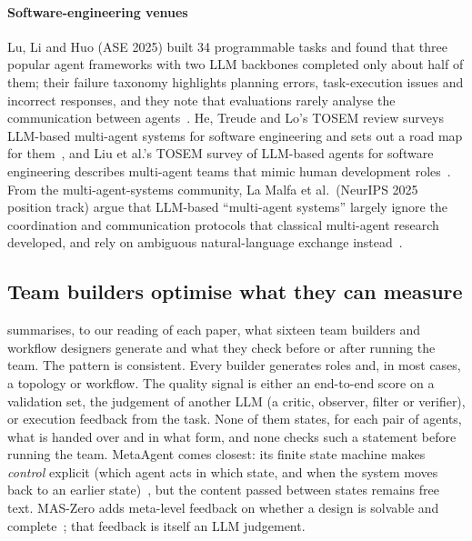 \documentclass[10pt,a4paper]{article}
\begin{document}
\paragraph{Software-engineering venues} Lu, Li and Huo (ASE 2025) built 34
programmable tasks and found that three popular agent frameworks with two
LLM backbones completed only about half of them; their failure taxonomy
highlights planning errors, task-execution issues and incorrect responses,
and they note that evaluations rarely analyse the communication between
agents~\cite{lu2025exploring}. He, Treude and Lo's TOSEM review surveys
LLM-based multi-agent systems for software engineering and sets out a road
map for them~\cite{he2025lma}, and Liu et al.'s TOSEM survey of LLM-based
agents for software engineering describes multi-agent teams that mimic
human development roles~\cite{liu2024agents4se}.
From the multi-agent-systems community, La Malfa et al.\ (NeurIPS 2025
position track) argue that LLM-based ``multi-agent systems'' largely
ignore the coordination and communication protocols that classical
multi-agent research developed, and rely on ambiguous natural-language
exchange instead~\cite{lamalfa2025miss}.

\subsection{Team builders optimise what they can measure}\label{sec:ev-builders}

 summarises, to our reading of each paper, what
sixteen team builders and workflow designers generate and what they check before or after running the
team. The pattern is consistent. Every builder generates roles and, in most
cases, a topology or workflow. The quality signal is either an end-to-end
score on a validation set, the judgement of another LLM (a critic, observer,
filter or verifier), or execution feedback from the task. None of them
states, for each pair of agents, what is handed over and in what form, and
none checks such a statement before running the team. MetaAgent comes
closest: its finite state machine makes \emph{control} explicit (which agent
acts in which state, and when the system moves back to an earlier
state)~\cite{zhang2025metaagent}, but the content passed between states
remains free text. MAS-Zero adds meta-level feedback on whether a design is
solvable and complete~\cite{ke2025maszero}; that feedback is itself an LLM
judgement.
\end{document}
